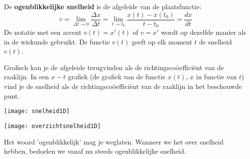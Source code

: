 \documentclass{ximera}
\begin{document}
\begin{definition}
	
De \textbf{ogenblikkelijke snelheid}  is de afgeleide van de plaatsfunctie:
\[
v=\lim_{\Delta t\to 0}\frac{\Delta x}{\Delta t}=\lim_{t\to t_0}\frac{x(t)-x(t_0)}{t-t_0}=\frac{dx}{dt}
\]
De notatie met een accent $v(t)=x'(t)$ of $v=x'$ wordt op dezelfde manier als in de wiskunde gebruikt. 
De functie $v(t)$ geeft op elk moment $t$ de snelheid $v(t)$. 
\end{definition}


Grafisch kan je de afgeleide terugvinden als de richtingscoöefficiënt van de raaklijn. In een $x-t$ grafiek (de grafiek van de functie $x(t)$, $x$ in functie van $t$) vind je  de snelheid als de richtingscoöefficiënt van de raaklijn in het beschouwde punt. 

\begin{image}
\texttt{[image: snelheid1D]}

\end{image}

\begin{image}
\texttt{[image: overzichtsnelheid1D]}

\end{image}

\begin{remark}
	Het woord 'ogenblikkelijk' mag je weglaten. Wanneer we het over snelheid hebben, bedoelen we vanaf nu steeds ogenblikkelijke snelheid.
\end{remark}
\end{document}
